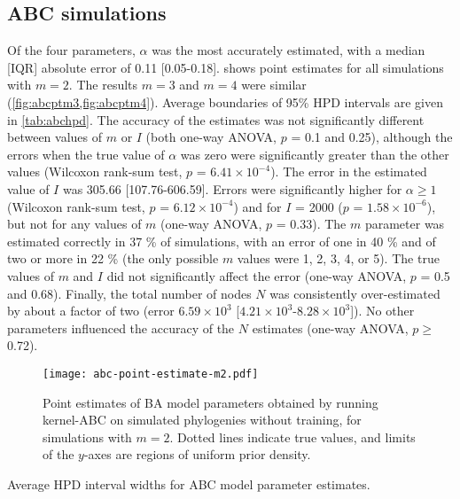 \documentclass[12pt]{article}\usepackage[]{graphicx}\usepackage[]{color}
\newcommand{\tablepath}{../tables}
\begin{document}
\subsection*{ABC simulations}



Of the four parameters, $\alpha$ was the most accurately estimated, with a
median [IQR] absolute error of 
    0.11 
    [0.05-0.18].
 shows point estimates for all simulations with $m = 2$. The
results $m = 3$ and $m = 4$ were similar (\cref{fig:abcptm3,fig:abcptm4}).
Average boundaries of 95\% \gls{HPD} intervals are given in \cref{tab:abchpd}.
The accuracy of the estimates was not significantly different between values of
$m$ or $I$ (both one-way ANOVA,
    $p$ = 0.1
and 
    0.25),
although the errors when the true value of $\alpha$ was zero were
significantly greater than the other values 
    (Wilcoxon rank-sum test, $p$ = \ensuremath{6.41\times 10^{-4}}).
The error in the estimated value of $I$ was
    305.66 
    [107.76-606.59].
Errors were significantly higher for $\alpha \geq 1$
    (Wilcoxon rank-sum test, $p$ = \ensuremath{6.12\times 10^{-4}})
and for $I$ = 2000
    ($p$ = \ensuremath{1.58\times 10^{-6}}),
but not for any values of $m$
    (one-way ANOVA, $p$ = 0.33).
The $m$ parameter was estimated correctly in
    37 \%
of simulations, with an error of one in
    40 \%
and of two or more in 
    22 \%
(the only possible $m$ values were 1, 2, 3, 4, or 5). The true values of $m$
and $I$ did not significantly affect the error
    (one-way ANOVA, $p$ = 0.5 and
                          0.68).
Finally, the total number of nodes $N$ was consistently over-estimated by about
a factor of two
    (error \ensuremath{6.59\times 10^{3}} 
    [\ensuremath{4.21\times 10^{3}}-\ensuremath{8.28\times 10^{3}}]).
No other parameters influenced the accuracy of the $N$ estimates 
    (one-way ANOVA, $p \geq$ 0.72).

\begin{figure}[ht]
  \centering
  \texttt{[image: abc-point-estimate-m2.pdf]}
  \caption{
    Point estimates of \gls{BA} model parameters obtained by running kernel-ABC
    on simulated phylogenies without training, for simulations with $m = 2$.
    Dotted lines indicate true values, and limits of the $y$-axes are regions
    of uniform prior density.
  }
  \label{fig:abcpt}
\end{figure}

\begin{table}[ht]
  \centering
  
  \caption{Average \gls{HPD} interval widths for \gls{ABC} model parameter
           estimates.}
  \label{tab:abchpd}
\end{table}
\end{document}
